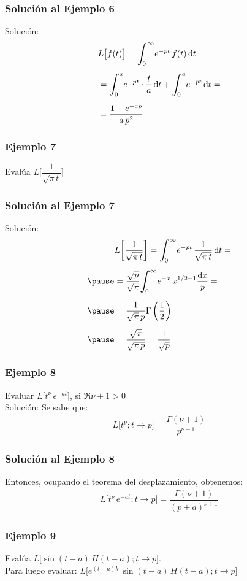 \begin{frame}
\frametitle{Solución al Ejemplo 6}
Solución:
\pause
\begin{align*}
&L \big[  f (t)  \big] = \scaleint{6ex}_{\bs 0}^{\infty} e^{-p t} \, f (t) \dd{t}  = \\[0.5em]
&= \scaleint{6ex}_{\bs 0}^{a} e^{-p t} \cdot \dfrac{t}{a} \dd{t} + \scaleint{6ex}_{\bs 0}^{a} e^{-p t} \dd{t} = \\[0.5em]
&= \dfrac{1 - e^{- a p}}{a \, p^{2}}
\end{align*}
\end{frame}
\begin{frame}
\frametitle{Ejemplo 7}
Evalúa $L \bigg[\dfrac{1}{\sqrt{\pi \, t}}\bigg]$
\end{frame}
\begin{frame}
\frametitle{Solución al Ejemplo 7}
Solución:
\pause
\begin{eqnarray*}
\begin{aligned}
&L \bigg[ \dfrac{1}{\sqrt{\pi \, t}} \bigg] = \scaleint{6ex}_{\bs 0}^{\infty} e^{- p t} \, \dfrac{1}{\sqrt{\pi \, t}} \dd{t} = \\[0.5em] \pause
&= \dfrac{\sqrt{p}}{\sqrt{\pi}} \scaleint{6ex}_{\bs 0}^{\infty} e^{-x} \, x^{1/2 - 1} \dfrac{\dd{x}}{p} = \\[0.5em] \pause
&= \dfrac{1}{\sqrt{\pi} \, p} \Gamma \left( \dfrac{1}{2} \right) = \\[0.5em] \pause
&= \dfrac{\sqrt{\pi}}{\sqrt{\pi \, p}} = \dfrac{1}{\sqrt{p}}
\end{aligned}
\end{eqnarray*}
\end{frame}
\begin{frame}
\frametitle{Ejemplo 8}
Evaluar $L \big[  t^{\nu} \, e^{-a t}  \big]$, si $\Re{\nu + 1} > 0$
\\
\bigskip
\pause
Solución: Se sabe que:
\pause
\begin{align*}
L \big[  t^{\nu}; t \to p  \big] = \dfrac{\Gamma (\nu + 1)}{p^{\nu+1}}
\end{align*}
\end{frame}
\begin{frame}
\frametitle{Solución al Ejemplo 8}
Entonces, ocupando el teorema del desplazamiento, obtenemos:
\pause
\begin{align*}
L \big[  t^{\nu} \, e^{-a t}; t \to p  \big] = \dfrac{\Gamma (\nu + 1)}{(p + a)^{\nu+1}}
\end{align*}
\end{frame}
\begin{frame}
\frametitle{Ejemplo 9}
Evalúa $L \big[ \sin (t - a) \, H (t- a); t \to p  \big]$.
\\
\bigskip
\pause
Para luego evaluar: $L \big[  e^{(t-a) k} \, \sin (t - a) \, H(t- a); t \to p  \big]$
\end{frame}
